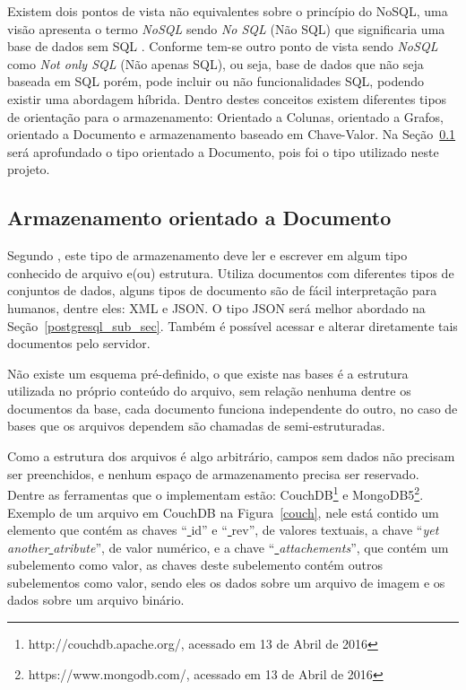 \documentclass[article,11pt,oneside,a4paper]{abntex2} %
\begin{document}
	Existem dois pontos de vista não equivalentes sobre o princípio do NoSQL, uma visão apresenta o termo \textit{NoSQL} sendo \textit{No SQL} (Não SQL) que significaria uma base de dados sem SQL \cite{nosql}. Conforme  tem-se outro ponto de vista sendo \textit{NoSQL} como \textit{Not only SQL} (Não apenas SQL), ou seja, base de dados que não seja baseada em SQL porém, pode incluir ou não funcionalidades SQL, podendo existir uma abordagem híbrida. Dentro destes conceitos existem diferentes tipos de orientação para o armazenamento: Orientado a Colunas, orientado a Grafos, orientado a Documento e armazenamento baseado em Chave-Valor. Na Seção~\ref{orient_doc} será aprofundado o tipo orientado a Documento, pois foi o tipo utilizado neste projeto.
	
	\subsection{Armazenamento orientado a Documento}
		\label{orient_doc}
		\hspace{13pt}
	Segundo , este tipo de armazenamento deve ler e escrever em algum tipo conhecido de arquivo e(ou) estrutura. Utiliza documentos com diferentes tipos de conjuntos de dados, alguns tipos de documento são de fácil interpretação para humanos, dentre eles: XML e JSON. O tipo JSON será melhor abordado na Seção~\ref{postgresql_sub_sec}. Também é possível acessar e alterar diretamente tais documentos pelo servidor.
	
	Não existe um esquema pré-definido, o que existe nas bases é a estrutura utilizada no próprio conteúdo do arquivo, sem relação nenhuma dentre os documentos da base, cada documento funciona independente do outro, no caso de bases que os arquivos dependem são chamadas de semi-estruturadas.
	
	Como a estrutura dos arquivos é algo arbitrário, campos sem dados não precisam ser preenchidos, e nenhum espaço de armazenamento precisa ser reservado. Dentre as ferramentas que o implementam estão: CouchDB\footnote{http://couchdb.apache.org/, acessado em 13 de Abril de 2016} e MongoDB5\footnote{https://www.mongodb.com/, acessado em 13 de Abril de 2016}. Exemplo de um arquivo em CouchDB  na Figura~\ref{couch}, nele está contido um elemento que contém as chaves ``\underline{ }id'' e ``\underline{ }rev'', de valores textuais, a chave ``\textit{yet\underline{ }another\underline{ }atribute}'', de valor numérico, e a chave ``\textit{\underline{ }attachements}'', que contém um subelemento como valor, as chaves deste subelemento contém outros subelementos como valor, sendo eles os dados sobre um arquivo de imagem e os dados sobre um arquivo binário.
	
\end{document}
